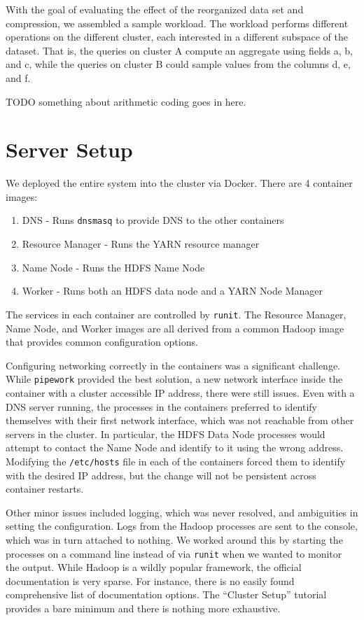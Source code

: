 \documentclass[paper=letter, fontsize=11pt]{scrartcl}
\numberwithin{equation}{section}		%
\numberwithin{figure}{section}			%
\numberwithin{table}{section}				%
\begin{document}
With the goal of evaluating the effect of the reorganized data set and compression, we assembled a sample workload.
The workload performs different operations on the different cluster, each interested in a different subspace of the dataset.
That is, the queries on cluster A compute an aggregate using fields a, b, and c, while the queries on cluster B could sample values from the columns d, e, and f.

TODO something about arithmetic coding goes in here.

\section{Server Setup}
We deployed the entire system into the cluster via Docker.
There are 4 container images:
\begin{enumerate}
\item DNS - Runs \texttt{dnsmasq} to provide DNS to the other containers
\item Resource Manager - Runs the YARN resource manager
\item Name Node - Runs the HDFS Name Node
\item Worker - Runs both an HDFS data node and a YARN Node Manager
\end{enumerate}

The services in each container are controlled by \texttt{runit}.  The Resource Manager, Name Node, and Worker images are all derived from a common Hadoop image that provides common configuration options.

Configuring networking correctly in the containers was a significant challenge.
While \texttt{pipework} provided the best solution, a new network interface inside the container with a cluster accessible IP address, there were still issues.
Even with a DNS server running, the processes in the containers preferred to identify themselves with their first network interface, which was not reachable from other servers in the cluster.
In particular, the HDFS Data Node processes would attempt to contact the Name Node and identify to it using the wrong address.
Modifying the \texttt{/etc/hosts} file in each of the containers forced them to identify with the desired IP address, but the change will not be persistent across container restarts.

Other minor issues included logging, which was never resolved, and ambiguities in setting the configuration. Logs from the Hadoop processes are sent to the console, which was in turn attached to nothing.  We worked around this by starting the processes on a command line instead of via \texttt{runit} when we wanted to monitor the output.  While Hadoop is a wildly popular framework, the official documentation is very sparse.  For instance, there is no easily found comprehensive list of documentation options.  The ``Cluster Setup'' tutorial provides a bare minimum and there is nothing more exhaustive.
\end{document}
